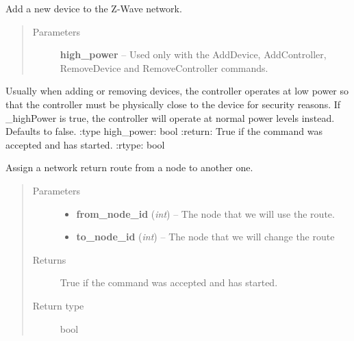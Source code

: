 \documentclass[letterpaper,10pt,english]{sphinxmanual}
\begin{document}
\begin{fulllineitems}
\begin{fulllineitems}
\label{controller:openzwave.controller.ZWaveController.begin_command_add_device}
Add a new device to the Z-Wave network.
\begin{quote}\begin{description}
\item[{Parameters}] \leavevmode
\textbf{high\_power} -- Used only with the AddDevice, AddController, RemoveDevice and RemoveController commands.

\end{description}\end{quote}

Usually when adding or removing devices, the controller operates at low power so that the controller must
be physically close to the device for security reasons.  If \_highPower is true, the controller will
operate at normal power levels instead.  Defaults to false.
:type high\_power: bool
:return: True if the command was accepted and has started.
:rtype: bool

\end{fulllineitems}


\begin{fulllineitems}
\label{controller:openzwave.controller.ZWaveController.begin_command_assign_return_route}
Assign a network return route from a node to another one.
\begin{quote}\begin{description}
\item[{Parameters}] \leavevmode\begin{itemize}
\item {} 
\textbf{from\_node\_id} (\emph{int}) -- The node that we will use the route.

\item {} 
\textbf{to\_node\_id} (\emph{int}) -- The node that we will change the route

\end{itemize}

\item[{Returns}] \leavevmode
True if the command was accepted and has started.

\item[{Return type}] \leavevmode
bool


\end{description}
\end{quote}
\end{fulllineitems}
\end{fulllineitems}
\end{document}
